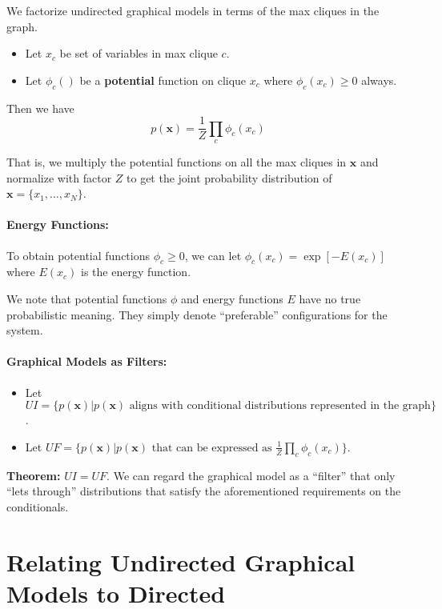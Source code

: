 \documentclass[a4paper,12pt]{report}
\begin{document}
We factorize undirected graphical models in terms of the max cliques in the graph.

\begin{itemize}
\item Let $x_c$ be set of variables in max clique $c$.
\item Let $\phi_c()$ be a \textbf{potential} function on clique $x_c$ where $\phi_c(x_c) \geq 0$ always.
\end{itemize}
Then we have
\begin{equation}
p(\pmb x) = \frac{1}{Z} \prod_c \phi_c(x_c)
\end{equation}

That is, we multiply the potential functions on all the max cliques in $\pmb x$ and normalize with factor $Z$ to get the joint probability distribution of $\pmb x = \{x_1, \dots, x_N\}$.

\paragraph{Energy Functions: } To obtain potential functions $\phi_c \geq 0$, we can let $\phi_c(x_c) = \exp[-E(x_c)]$ where $E(x_c)$ is the energy function.


We note that potential functions $\phi$ and energy functions $E$ have no true probabilistic meaning. They simply denote ``preferable'' configurations for the system. 

\paragraph{Graphical Models as Filters: } 
\begin{itemize}
\item Let $UI = \{p(\pmb x) | p(\pmb x) \text{ aligns with conditional distributions represented in the graph}\}$.
\item Let $UF = \{p(\pmb x) | p(\pmb x) \text{ that can be expressed as } \frac{1}{Z} \prod_c \phi_c(x_c)\}$.
\end{itemize}

\textbf{Theorem: } $UI = UF$. We can regard the graphical model as a ``filter'' that only ``lets through'' distributions that satisfy the aforementioned requirements on the conditionals.

\section{Relating Undirected Graphical Models to Directed}
\end{document}
